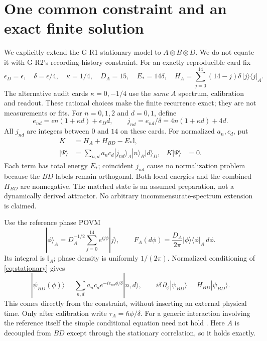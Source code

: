 \documentclass[11pt,a4paper]{article}
\newcommand{\id}{\mathbb I}
\newcommand{\ket}[1]{|#1\rangle}
\newcommand{\bra}[1]{\langle#1|}
\newcommand{\pr}[1]{\ket{#1}\bra{#1}}
\begin{document}
\newpage
\section{One common constraint and an exact finite solution}
We explicitly extend the G-R1 stationary model to $A\otimes B\otimes D$.
We do not equate it with G-R2's recording-history constraint.
For an exactly reproducible card fix
\begin{equation}
 \epsilon_D=\epsilon,\quad \delta=\epsilon/4,\quad
 \kappa=1/4,\quad D_A=15,\quad E_*=14\delta,\quad
 H_A=\sum_{j=0}^{14}(14-j)\delta\,\pr j_A .
\end{equation}
The alternative audit cards $\kappa=0,-1/4$ use the \emph{same}
$A$ spectrum, calibration and readout. These rational choices make the
finite recurrence exact; they are not measurements or fits.
For $n=0,1,2$ and $d=0,1$, define
\begin{equation}
 e_{nd}=\epsilon n(1+\kappa d)+\epsilon_Dd,\qquad
 j_{nd}=e_{nd}/\delta=4n(1+\kappa d)+4d .
\end{equation}
All $j_{nd}$ are integers between $0$ and $14$ on these cards.
For normalized $a_n,c_d$, put
\begin{align}
 K&=H_A+H_{BD}-E_*\id,\\
 \ket\Psi&=\sum_{n,d}a_nc_d\ket{j_{nd}}_A\ket n_B\ket d_D,
 &K\ket\Psi&=0 .\label{eq:stationary}
\end{align}
Each term has total energy $E_*$; coincident $j_{nd}$ cause no
normalization problem because the $BD$ labels remain orthogonal.
Both local energies and the combined $H_{BD}$ are nonnegative.
The matched state is an assumed preparation, not a dynamically
derived attractor. No arbitrary incommensurate-spectrum extension is claimed.

Use the reference phase POVM
\begin{equation}
 \ket\phi_A=D_A^{-1/2}\sum_{j=0}^{14}e^{ij\phi}\ket j,\qquad
 F_A(d\phi)=\frac{D_A}{2\pi}\pr\phi_A\,d\phi .
\end{equation}
Its integral is $\id_A$; phase density is uniformly $1/(2\pi)$.
Normalized conditioning of \eqref{eq:stationary} gives
\begin{equation}\label{eq:conditional}
 \ket{\psi_{BD}(\phi)}
 =\sum_{n,d}a_nc_de^{-ie_{nd}\phi/\delta}\ket{n,d},
 \qquad i\delta\,\partial_\phi\ket{\psi_{BD}}=H_{BD}\ket{\psi_{BD}} .
\end{equation}
This comes directly from the constraint, without inserting an external
physical time. Only after calibration write $\tau_A=\hbar\phi/\delta$.
For a generic interaction involving the reference itself the simple
conditional equation need not hold \cite{smith}. Here $A$ is decoupled
from $BD$ except through the stationary correlation, so it holds exactly.
\end{document}
